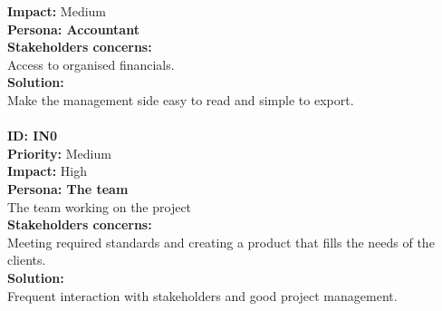 \textbf{Impact:} Medium\\
\textbf{Persona: Accountant\\}
\textbf{Stakeholders concerns:\\}
Access to organised financials.\\
\textbf{Solution:\\}
Make the management side easy to read and simple to export.\\
\\
\textbf{ID: IN0}\\
\textbf{Priority:} Medium\\
\textbf{Impact:} High\\
\textbf{Persona: The team\\}
The team working on the project\\
\textbf{Stakeholders concerns:\\}
Meeting required standards and creating a product that fills the needs of the clients.\\
\textbf{Solution:\\}
Frequent interaction with stakeholders and good project management.\\
\\
\pagebreak

